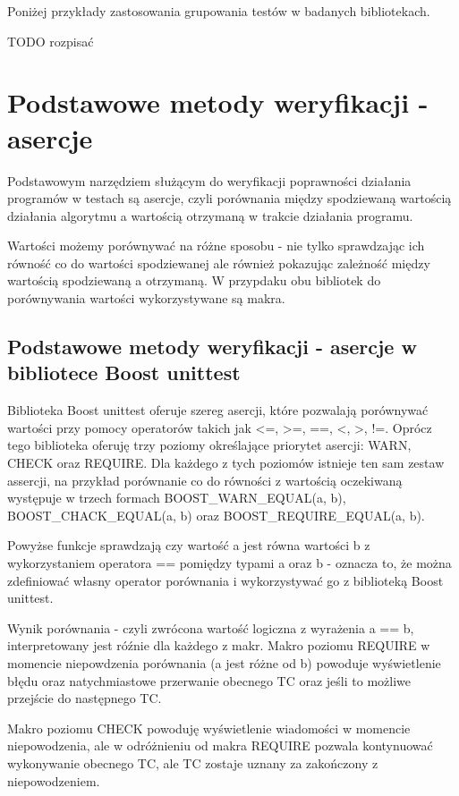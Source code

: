 \documentclass[12pt,a4paper,notitlepage]{report}
\begin{document}
Poniżej przykłady zastosowania grupowania testów w badanych bibliotekach.

TODO rozpisać

\chapter{Podstawowe metody weryfikacji - asercje}

Podstawowym narzędziem służącym do weryfikacji poprawności działania programów w testach są asercje, czyli porównania między spodziewaną wartością działania algorytmu a wartością otrzymaną w trakcie działania programu.

Wartości możemy porównywać na różne sposobu - nie tylko sprawdzając ich równość co do wartości spodziewanej ale również pokazując zależność między wartością spodziewaną a otrzymaną. W przypdaku obu bibliotek do porównywania wartości wykorzystywane są makra.

\section{Podstawowe metody weryfikacji - asercje w bibliotece Boost unittest}

Biblioteka Boost unittest oferuje szereg asercji, które pozwalają porównywać wartości przy pomocy operatorów takich jak <=, >=, ==, <, >, !=. Oprócz tego biblioteka oferuję trzy poziomy określające priorytet asercji: WARN, CHECK oraz REQUIRE. Dla każdego z tych poziomów istnieje ten sam zestaw assercji, na przykład porównanie co do równości z wartością oczekiwaną występuje w trzech formach BOOST{\_}WARN{\_}EQUAL(a, b), BOOST{\_}CHACK{\_}EQUAL(a, b) oraz BOOST{\_}REQUIRE{\_}EQUAL(a, b).

Powyżse funkcje sprawdzają czy wartość a jest równa wartości b z wykorzystaniem operatora == pomiędzy typami a oraz b - oznacza to, że można zdefiniować własny operator porównania i wykorzystywać go z biblioteką Boost unittest. 

Wynik porównania - czyli zwrócona wartość logiczna z wyrażenia a == b, interpretowany jest róźnie dla każdego z makr. Makro poziomu REQUIRE w momencie niepowdzenia porównania (a jest różne od b) powoduje wyświetlenie błędu oraz natychmiastowe przerwanie obecnego TC oraz jeśli to możliwe przejście do następnego TC.

Makro poziomu CHECK powoduję wyświetlenie wiadomości w momencie niepowodzenia, ale w odróżnieniu od makra REQUIRE pozwala kontynuować wykonywanie obecnego TC, ale TC zostaje uznany za zakończony z niepowodzeniem.
\end{document}
